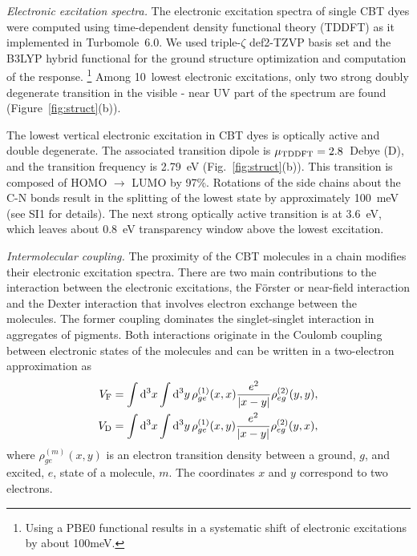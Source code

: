 \documentclass[journal=jacs,manuscript=article]{achemso}
\begin{document}
\textit{Electronic excitation spectra.}
The electronic excitation spectra of single CBT dyes were computed using time-dependent density functional theory (TDDFT) as it implemented in Turbomole~6.0.\cite{TM_general} We used triple-$\zeta$ def2-TZVP basis set\cite{BS_def2} and the B3LYP hybrid functional\cite{B3LYP} for the ground structure optimization and computation of the response. \footnote{Using a PBE0 functional results in a systematic shift of electronic excitations by about 100meV.} Among 10~lowest electronic excitations, only two strong doubly degenerate transition in the visible - near UV part of the spectrum are found (Figure~\ref{fig:struct}(b)).

The lowest vertical electronic excitation in CBT dyes is optically active and double degenerate. The associated transition dipole is $\mu_{\rm TDDFT}=2.8$~Debye (D), and the transition frequency is 2.79~eV (Fig.~\ref{fig:struct}(b)). This transition is composed of HOMO $\rightarrow$ LUMO by 97\%. Rotations of the side chains about the C-N bonds result in the splitting of the lowest state by approximately 100~meV (see SI1 for details). The next strong optically active transition is at 3.6~eV, which leaves about 0.8~eV transparency window above the lowest excitation.

\textit{Intermolecular coupling.} The proximity of the CBT molecules in a chain modifies their electronic excitation spectra. There are two main contributions to the interaction between the electronic excitations, the F\"orster or near-field interaction\cite{Foe65_93_} and the Dexter interaction \cite{Dexter_JCP1953} that involves electron exchange between the molecules. The former coupling dominates the singlet-singlet interaction in aggregates of pigments. Both interactions originate in the Coulomb coupling between electronic states of the molecules and can be written in a two-electron approximation as
\begin{align}
    V_{\rm F}&= \int \mathrm{d}^3x \int \mathrm{d}^3y \, \rho^{(1)}_{ge}(x,x) \frac{e^2}{|x-y|}\rho^{(2)}_{eg}(y,y), \label{V_F}\\
    V_{\rm D}&= \int \mathrm{d}^3x \int \mathrm{d}^3y \, \rho^{(1)}_{ge}(x,y) \frac{e^2}{|x-y|}\rho^{(2)}_{eg}(y,x),\label{V_D}
\end{align}
\noindent where $\rho^{(m)}_{ge}(x,y)$  is an electron transition density between a ground, $g$, and excited, $e$, state of a molecule, $m$. The coordinates $x$ and $y$ correspond to two electrons.
\end{document}
